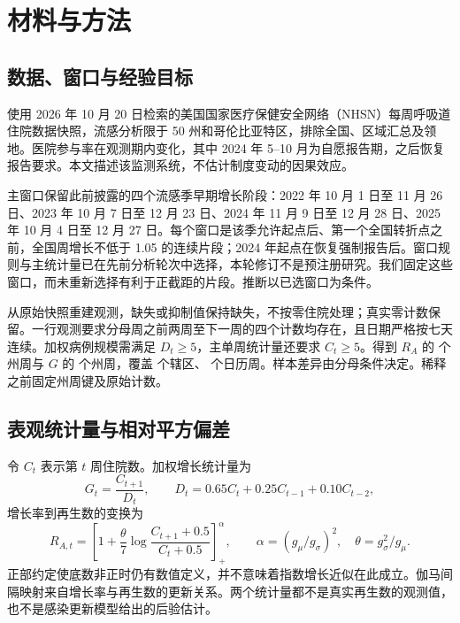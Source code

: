 \section{材料与方法}
\label{sec:methods}

\subsection{数据、窗口与经验目标}
\label{sec:meth-data}

使用 2026 年 10 月 20 日检索的美国国家医疗保健安全网络（NHSN）每周呼吸道住院数据快照，流感分析限于 50 州和哥伦比亚特区\citep{cdc2026nhsn,frutos2025evaluation}，排除全国、区域汇总及领地。医院参与率在观测期内变化，其中 2024 年 5--10 月为自愿报告期，之后恢复报告要求\citep{cms2024reporting}。本文描述该监测系统，不估计制度变动的因果效应。

主窗口保留此前披露的四个流感季早期增长阶段：2022 年 10 月 1 日至 11 月 26 日、2023 年 10 月 7 日至 12 月 23 日、2024 年 11 月 9 日至 12 月 28 日、2025 年 10 月 4 日至 12 月 27 日。每个窗口是该季允许起点后、第一个全国转折点之前，全国周增长不低于 1.05 的连续片段；2024 年起点在恢复强制报告后。窗口规则与主统计量已在先前分析轮次中选择，本轮修订不是预注册研究。我们固定这些窗口，而未重新选择有利于正截距的片段。推断以已选窗口为条件。

从原始快照重建观测，缺失或抑制值保持缺失，不按零住院处理；真实零计数保留。一行观测要求分母周之前两周至下一周的四个计数均存在，且日期严格按七天连续。加权病例规模需满足 $D_t\ge5$，主单周统计量还要求 $C_t\ge5$。得到 $R_A$ 的 \Nra{} 个州周与 $G$ 的 \Ngs{} 个州周，覆盖 \Nstates{} 个辖区、\Nweeks{} 个日历周。样本差异由分母条件决定。稀释之前固定州周键及原始计数。

\subsection{表观统计量与相对平方偏差}
\label{sec:meth-stats}

令 $C_t$ 表示第 $t$ 周住院数。加权增长统计量为
\begin{equation}
G_t=\frac{C_{t+1}}{D_t},\qquad D_t=0.65C_t+0.25C_{t-1}+0.10C_{t-2},
\label{eq:dt}
\end{equation}
增长率到再生数的变换为
\begin{equation}
R_{A,t}=\left[1+\frac{\theta}{7}\log\frac{C_{t+1}+0.5}{C_t+0.5}\right]_{+}^{\alpha},\qquad
\alpha=(g_\mu/g_\sigma)^2,\quad\theta=g_\sigma^2/g_\mu.
\label{eq:ra}
\end{equation}
正部约定使底数非正时仍有数值定义，并不意味着指数增长近似在此成立。伽马间隔映射来自增长率与再生数的更新关系\citep{wallinga2007how}。两个统计量都不是真实再生数的观测值，也不是感染更新模型给出的后验估计\citep{cori2013new,eales2024differences}。


